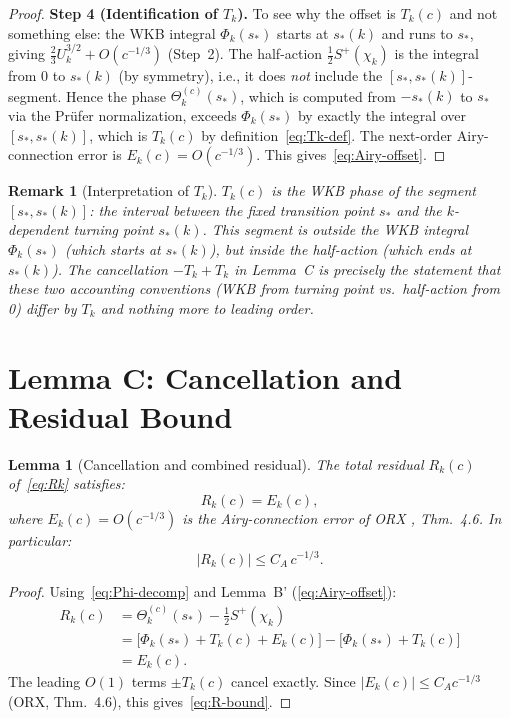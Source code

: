 \documentclass[12pt]{amsart}
\newtheorem{lemma}[theorem]{Lemma}
\newtheorem{remark}[theorem]{Remark}
\begin{document}
\begin{proof}
\textbf{Step 4 (Identification of $T_k$).}
To see why the offset is $T_k(c)$ and not something else:
the WKB integral $\Phi_k(s_*)$ starts at $s_*(k)$ and runs
to $s_*$, giving $\tfrac23 U_k^{3/2} + O(c^{-1/3})$
(Step~2).
The half-action $\frac12 S^+(\chi_k)$ is the integral from
$0$ to $s_*(k)$ (by symmetry), i.e., it does \emph{not}
include the $[s_*, s_*(k)]$-segment.
Hence the phase $\Theta_k^{(c)}(s_*)$, which is computed
from $-s_*(k)$ to $s_*$ via the Pr\"ufer normalization,
exceeds $\Phi_k(s_*)$ by exactly the integral over
$[s_*, s_*(k)]$, which is $T_k(c)$ by definition~\eqref{eq:Tk-def}.
The next-order Airy-connection error is $E_k(c) = O(c^{-1/3})$.
This gives~\eqref{eq:Airy-offset}.
\end{proof}

\begin{remark}[Interpretation of $T_k$]
\label{rem:Tk-interpretation}
$T_k(c)$ is the WKB phase of the segment $[s_*, s_*(k)]$:
the interval between the fixed transition point $s_*$
and the $k$-dependent turning point $s_*(k)$.
This segment is outside the WKB integral $\Phi_k(s_*)$
(which starts at $s_*(k)$), but inside the half-action
(which ends at $s_*(k)$).
The cancellation $-T_k + T_k$ in Lemma~C is precisely
the statement that these two accounting conventions
(WKB from turning point vs.~half-action from 0)
differ by $T_k$ and nothing more to leading order.
\end{remark}

\section{Lemma C: Cancellation and Residual Bound}
\label{sec:lemmaC}

\begin{lemma}[Cancellation and combined residual]
\label{lem:C}
The total residual $R_k(c)$ of~\eqref{eq:Rk} satisfies:
\begin{equation}\label{eq:Rk-is-Ek}
  R_k(c) = E_k(c),
\end{equation}
where $E_k(c) = O(c^{-1/3})$ is the Airy-connection error
of ORX \cite{OsipovRokhlinXiao}, Thm.~4.6.
In particular:
\begin{equation}\label{eq:R-bound}
  |R_k(c)| \le C_A\,c^{-1/3}.
\end{equation}
\end{lemma}

\begin{proof}
Using~\eqref{eq:Phi-decomp} and Lemma~B' (\eqref{eq:Airy-offset}):
\begin{align*}
  R_k(c)
  &= \Theta_k^{(c)}(s_*) - \tfrac12 S^+(\chi_k) \\
  &= \bigl[\Phi_k(s_*) + T_k(c) + E_k(c)\bigr]
     - \bigl[\Phi_k(s_*) + T_k(c)\bigr] \\
  &= E_k(c).
\end{align*}
The leading $O(1)$ terms $\pm T_k(c)$ cancel exactly.
Since $|E_k(c)| \le C_A c^{-1/3}$ (ORX, Thm.~4.6),
this gives~\eqref{eq:R-bound}.
\end{proof}
\end{document}
